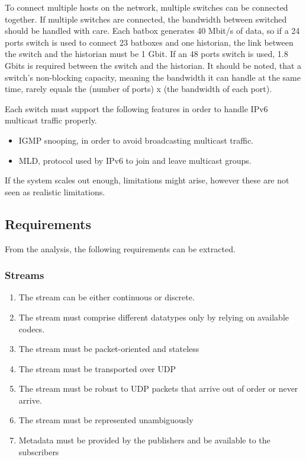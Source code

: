 To connect multiple hosts on the network, multiple switches can be connected together. If multiple switches are connected, the bandwidth between switched should be handled with care. Each batbox generates 40 Mbit/s of data, so if a 24 ports switch is used to connect 23 batboxes and one historian, the link between the switch and the historian must be 1 Gbit. If an 48 ports switch is used, 1.8 Gbits is required between the switch and the historian. It should be noted, that a switch's non-blocking capacity, meaning the bandwidth it can handle at the same time, rarely equals the (number of ports) x (the bandwidth of each port).

Each switch must support the following features in order to handle IPv6 multicast traffic properly.

\begin{itemize}
	 \item IGMP snooping, in order to avoid broadcasting multicast traffic.
	 \item MLD, protocol used by IPv6 to join and leave multicast groups.
\end{itemize}

If the system scales out enough, limitations might arise, however these are not seen as realistic limitations.


\subsection{Requirements}
From the analysis, the following requirements can be extracted.
\subsubsection{Streams}
\begin{enumerate}
	\item The stream can be either continuous or discrete.
	\item The stream must comprise different datatypes only by relying on available codecs.
	\item The stream must be packet-oriented and stateless
	\item The stream must be transported over UDP
	\item The stream must be robust to UDP packets that arrive out of order or never arrive.
	\item The stream must be represented unambiguously
	\item Metadata must be provided by the publishers and be available to the subscribers 
\end{enumerate}
\todo{Table of requirements[Where it's defined][Where it's tested][Whether it passes}

